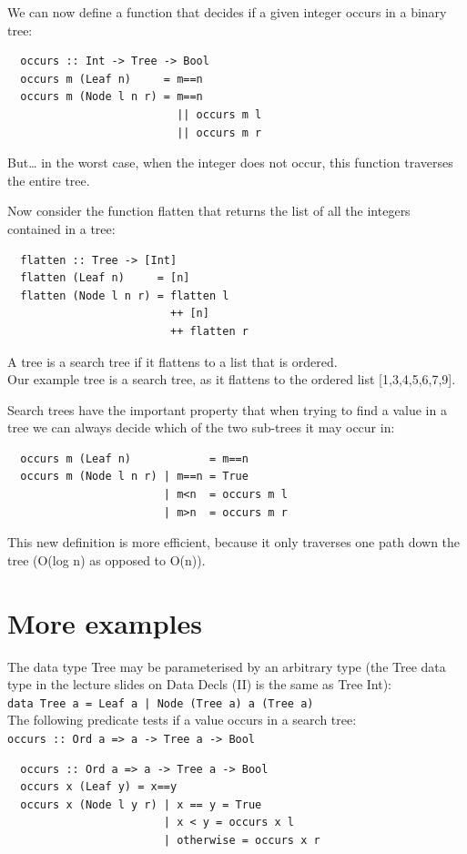 \documentclass[tikz,border=10pt]{project_plan}
\begin{document}
We can now define a function that decides if a given
integer occurs in a binary tree:
\begin{lstlisting}
  occurs :: Int -> Tree -> Bool
  occurs m (Leaf n)     = m==n
  occurs m (Node l n r) = m==n
                          || occurs m l
                          || occurs m r
\end{lstlisting}
But… in the worst case, when the integer does not occur,
this function traverses the entire tree.

Now consider the function flatten that returns the list of all
the integers contained in a tree:
\begin{lstlisting}
  flatten :: Tree -> [Int]
  flatten (Leaf n)     = [n]
  flatten (Node l n r) = flatten l
                         ++ [n]
                         ++ flatten r
\end{lstlisting}
A tree is a search tree if it flattens to a list that is ordered.\\
Our example tree is a search tree, as it flattens to the
ordered list [1,3,4,5,6,7,9].

Search trees have the important property that when trying
to find a value in a tree we can always decide which of
the two sub-trees it may occur in:
\begin{lstlisting}
  occurs m (Leaf n)            = m==n
  occurs m (Node l n r) | m==n = True
                        | m<n  = occurs m l
                        | m>n  = occurs m r
\end{lstlisting}
This new definition is more efficient, because it only
traverses one path down the tree (O(log n) as opposed to
O(n)).

\section{More examples}

The data type Tree may be parameterised by an arbitrary type (the Tree
data type in the lecture slides on Data Decls (II) is the same as Tree Int):\\
\lstinline?data Tree a = Leaf a | Node (Tree a) a (Tree a)?\\
The following predicate tests if a value occurs in a search tree:\\
\lstinline?occurs :: Ord a => a -> Tree a -> Bool?
\begin{lstlisting}
  occurs :: Ord a => a -> Tree a -> Bool
  occurs x (Leaf y) = x==y
  occurs x (Node l y r) | x == y = True
                        | x < y = occurs x l
                        | otherwise = occurs x r
\end{lstlisting}
\end{document}
